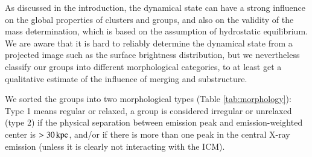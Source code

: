 \documentclass[structabstract]{aa}
\begin{document}
As discussed in the introduction, the dynamical state can have a strong
influence on the global properties of clusters and groups, and also on the
validity of the mass determination, which is based on the assumption of
hydrostatic equilibrium. We are aware that it is hard to reliably
determine the dynamical state from a projected image such as the surface
brightness distribution, but we nevertheless classify our groups
into different morphological categories, to at least get a qualitative
estimate of the influence of merging and substructure.

We sorted the groups into two morphological types (Table
\ref{tab:morphology}): Type 1 means regular or relaxed, a group is
considered irregular or unrelaxed (type 2) if the physical separation
between emission peak and emission-weighted center is
$>\unit[30]{kpc}$, and/or if there is more than one peak in the
central X-ray emission (unless it is clearly not interacting with the
ICM).
%
%
%
\end{document}
